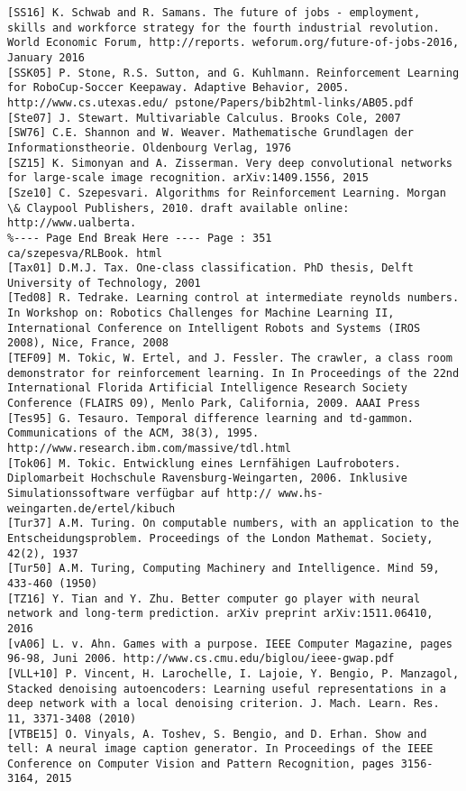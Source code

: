 \documentclass[10pt]{article}
\begin{document}
\begin{verbatim}
[SS16] K. Schwab and R. Samans. The future of jobs - employment, skills and workforce strategy for the fourth industrial revolution. World Economic Forum, http://reports. weforum.org/future-of-jobs-2016, January 2016
[SSK05] P. Stone, R.S. Sutton, and G. Kuhlmann. Reinforcement Learning for RoboCup-Soccer Keepaway. Adaptive Behavior, 2005. http://www.cs.utexas.edu/ pstone/Papers/bib2html-links/AB05.pdf
[Ste07] J. Stewart. Multivariable Calculus. Brooks Cole, 2007
[SW76] C.E. Shannon and W. Weaver. Mathematische Grundlagen der Informationstheorie. Oldenbourg Verlag, 1976
[SZ15] K. Simonyan and A. Zisserman. Very deep convolutional networks for large-scale image recognition. arXiv:1409.1556, 2015
[Sze10] C. Szepesvari. Algorithms for Reinforcement Learning. Morgan \& Claypool Publishers, 2010. draft available online: http://www.ualberta.
%---- Page End Break Here ---- Page : 351
ca/szepesva/RLBook. html
[Tax01] D.M.J. Tax. One-class classification. PhD thesis, Delft University of Technology, 2001
[Ted08] R. Tedrake. Learning control at intermediate reynolds numbers. In Workshop on: Robotics Challenges for Machine Learning II, International Conference on Intelligent Robots and Systems (IROS 2008), Nice, France, 2008
[TEF09] M. Tokic, W. Ertel, and J. Fessler. The crawler, a class room demonstrator for reinforcement learning. In In Proceedings of the 22nd International Florida Artificial Intelligence Research Society Conference (FLAIRS 09), Menlo Park, California, 2009. AAAI Press
[Tes95] G. Tesauro. Temporal difference learning and td-gammon. Communications of the ACM, 38(3), 1995. http://www.research.ibm.com/massive/tdl.html
[Tok06] M. Tokic. Entwicklung eines Lernfähigen Laufroboters. Diplomarbeit Hochschule Ravensburg-Weingarten, 2006. Inklusive Simulationssoftware verfügbar auf http:// www.hs-weingarten.de/ertel/kibuch
[Tur37] A.M. Turing. On computable numbers, with an application to the Entscheidungsproblem. Proceedings of the London Mathemat. Society, 42(2), 1937
[Tur50] A.M. Turing, Computing Machinery and Intelligence. Mind 59, 433-460 (1950)
[TZ16] Y. Tian and Y. Zhu. Better computer go player with neural network and long-term prediction. arXiv preprint arXiv:1511.06410, 2016
[vA06] L. v. Ahn. Games with a purpose. IEEE Computer Magazine, pages 96-98, Juni 2006. http://www.cs.cmu.edu/biglou/ieee-gwap.pdf
[VLL+10] P. Vincent, H. Larochelle, I. Lajoie, Y. Bengio, P. Manzagol, Stacked denoising autoencoders: Learning useful representations in a deep network with a local denoising criterion. J. Mach. Learn. Res. 11, 3371-3408 (2010)
[VTBE15] O. Vinyals, A. Toshev, S. Bengio, and D. Erhan. Show and tell: A neural image caption generator. In Proceedings of the IEEE Conference on Computer Vision and Pattern Recognition, pages 3156-3164, 2015

\end{verbatim}
\end{document}
